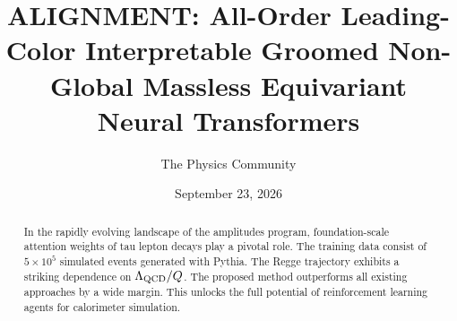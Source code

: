 \documentclass[11pt]{article}
\title{ALIGNMENT: All-Order Leading-Color Interpretable Groomed Non-Global Massless Equivariant Neural Transformers}
\author{The Physics Community}
\date{September 23, 2026}
\numberwithin{equation}{section}
\theoremstyle{definition}
\theoremstyle{remark}
\begin{document}
\maketitle
\begin{abstract}
In the rapidly evolving landscape of the amplitudes program,
foundation-scale attention weights of tau lepton decays play a pivotal
role. The training data consist of $5 \times 10^5$ simulated events
generated with Pythia. The Regge trajectory exhibits a striking
dependence on $\Lambda_{\rm QCD}/Q$. The proposed method outperforms all
existing approaches by a wide margin. This unlocks the full potential of
reinforcement learning agents for calorimeter simulation.
\end{abstract}
\tableofcontents



\nocite{*}


\end{document}
